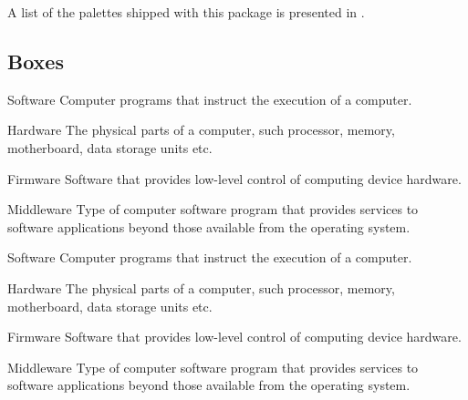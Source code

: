 \documentclass[a4paper, 11pt]{article}
\begin{document}
A list of the palettes shipped with this package is presented in .

\subsection{Boxes}\label{sec:boxing}

\begin{tcblisting}{}
    \begin{PLTBoxItemize}
        \item[Software] Computer programs that instruct the execution of a computer.
        \item[Hardware] The physical parts of a computer, such processor, memory, motherboard, data storage units etc.
        \item[Firmware] Software that provides low-level control of computing device hardware.
        \item[Middleware] Type of computer software program that provides services to software applications beyond those available from the operating system.
    \end{PLTBoxItemize}
\end{tcblisting}

\begin{tcblisting}{}
    \begin{PLTBoxItemize}
        \item[Software] Computer programs that instruct the execution of a computer.
        \item[Hardware] The physical parts of a computer, such processor, memory, motherboard, data storage units etc.
        \item[Firmware] Software that provides low-level control of computing device hardware.
        \item[Middleware] Type of computer software program that provides services to software applications beyond those available from the operating system.
    \end{PLTBoxItemize}
\end{tcblisting}
\end{document}
